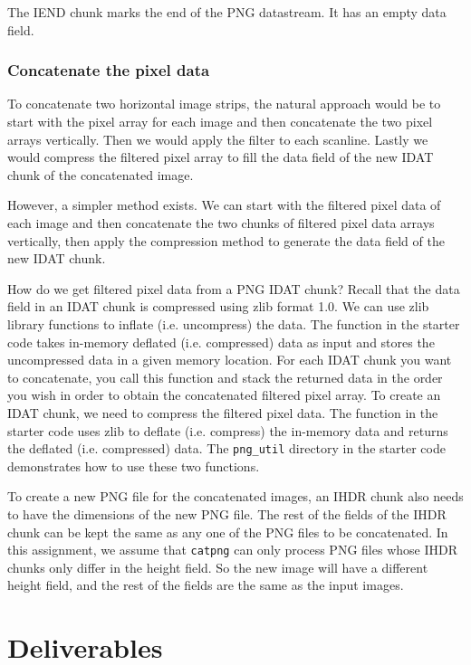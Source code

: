 The IEND chunk marks the end of the PNG datastream. It has an empty data field.

\subsubsection{Concatenate the pixel data}
To concatenate two horizontal image strips, the natural approach would be to start with the pixel array for each image and then concatenate the two pixel arrays vertically. Then we would apply the filter to each scanline. Lastly we would compress the filtered pixel array to fill the data field of the new IDAT chunk of the concatenated image.

However, a simpler method exists. We can start with the filtered pixel data of each image and then concatenate the two chunks of filtered pixel data arrays vertically, then apply the compression method to generate the data field of the new IDAT chunk.

How do we get filtered pixel data from a PNG IDAT chunk? Recall that the data field in an IDAT chunk is compressed using zlib format 1.0. We can use zlib library functions to inflate (i.e. uncompress) the data. The  function in the starter code takes in-memory deflated (i.e. compressed) data as input and stores the uncompressed data in a given memory location. For each IDAT chunk you want to concatenate, you call this function and stack the returned data in the order you wish in order to obtain the concatenated filtered pixel array. To create an IDAT chunk, we need to compress the filtered pixel data. The  function in the starter code uses zlib to deflate (i.e. compress) the in-memory data and returns the deflated (i.e. compressed) data. The \verb+png_util+ directory in the starter code demonstrates how to use these two functions.

To create a new PNG file for the concatenated images, an IHDR chunk also needs to have the dimensions of the new PNG file. The rest of the fields of the IHDR chunk can be kept the same as any one of the PNG files to be concatenated. In this assignment, we assume that \verb+catpng+ can only process PNG files whose IHDR chunks only differ in the height field. So the new image will have a different height field, and  the rest of the fields are the same as the input images.



\section{Deliverables}
